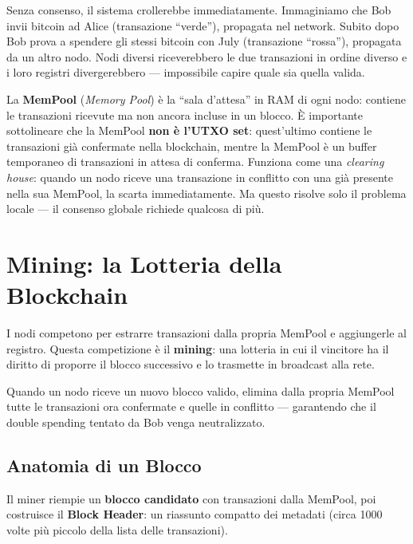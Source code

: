 \documentclass[
  italian,
  openany]{book}
\begin{document}
Senza consenso, il sistema crollerebbe immediatamente. Immaginiamo che
Bob invii bitcoin ad Alice (transazione ``verde''), propagata nel
network. Subito dopo Bob prova a spendere gli stessi bitcoin con July
(transazione ``rossa''), propagata da un altro nodo. Nodi diversi
riceverebbero le due transazioni in ordine diverso e i loro registri
divergerebbero --- impossibile capire quale sia quella valida.

La \textbf{MemPool} (\emph{Memory Pool}) è la ``sala d'attesa'' in RAM
di ogni nodo: contiene le transazioni ricevute ma non ancora incluse in
un blocco. È importante sottolineare che la MemPool \textbf{non è l'UTXO
set}: quest'ultimo contiene le transazioni già confermate nella
blockchain, mentre la MemPool è un buffer temporaneo di transazioni in
attesa di conferma. Funziona come una \emph{clearing house}: quando un
nodo riceve una transazione in conflitto con una già presente nella sua
MemPool, la scarta immediatamente. Ma questo risolve solo il problema
locale --- il consenso globale richiede qualcosa di più.

\section{Mining: la Lotteria della
Blockchain}\label{mining-la-lotteria-della-blockchain}

I nodi competono per estrarre transazioni dalla propria MemPool e
aggiungerle al registro. Questa competizione è il \textbf{mining}: una
lotteria in cui il vincitore ha il diritto di proporre il blocco
successivo e lo trasmette in broadcast alla rete.

Quando un nodo riceve un nuovo blocco valido, elimina dalla propria
MemPool tutte le transazioni ora confermate e quelle in conflitto ---
garantendo che il double spending tentato da Bob venga neutralizzato.

\subsection{Anatomia di un Blocco}\label{anatomia-di-un-blocco}

Il miner riempie un \textbf{blocco candidato} con transazioni dalla
MemPool, poi costruisce il \textbf{Block Header}: un riassunto compatto
dei metadati (circa 1000 volte più piccolo della lista delle
transazioni).
\end{document}
